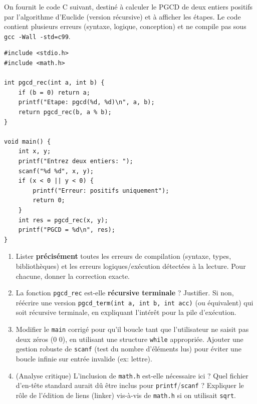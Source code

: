 \documentclass[11pt]{article}
\begin{document}
\begin{exercice}
On fournit le code C suivant, destiné à calculer le PGCD de deux entiers positifs par l'algorithme d'Euclide (version récursive) et à afficher les étapes. Le code contient plusieurs erreurs (syntaxe, logique, conception) et ne compile pas sous \texttt{gcc -Wall -std=c99}.
\begin{verbatim}
#include <stdio.h>
#include <math.h>

int pgcd_rec(int a, int b) {
    if (b = 0) return a;
    printf("Etape: pgcd(%d, %d)\n", a, b);
    return pgcd_rec(b, a % b);
}

void main() {
    int x, y;
    printf("Entrez deux entiers: ");
    scanf("%d %d", x, y);
    if (x < 0 || y < 0) {
        printf("Erreur: positifs uniquement");
        return 0;
    }
    int res = pgcd_rec(x, y);
    printf("PGCD = %d\n", res);
}
\end{verbatim}
\begin{enumerate}
    \item Lister \textbf{précisément} toutes les erreurs de compilation (syntaxe, types, bibliothèques) et les erreurs logiques/exécution détectées à la lecture. Pour chacune, donner la correction exacte.
    \item La fonction \texttt{pgcd\_rec} est-elle \textbf{récursive terminale} ? Justifier. Si non, réécrire une version \texttt{pgcd\_term(int a, int b, int acc)} (ou équivalent) qui soit récursive terminale, en expliquant l'intérêt pour la pile d'exécution.
    \item Modifier le \texttt{main} corrigé pour qu'il boucle tant que l'utilisateur ne saisit pas deux zéros (0 0), en utilisant une structure \texttt{while} appropriée. Ajouter une gestion robuste de \texttt{scanf} (test du nombre d'éléments lus) pour éviter une boucle infinie sur entrée invalide (ex: lettre).
    \item (Analyse critique) L'inclusion de \texttt{math.h} est-elle nécessaire ici ? Quel fichier d'en-tête standard aurait dû être inclus pour \texttt{printf}/\texttt{scanf} ? Expliquer le rôle de l'édition de liens (linker) vis-à-vis de \texttt{math.h} si on utilisait \texttt{sqrt}.
\end{enumerate}
\end{exercice}
\end{document}
